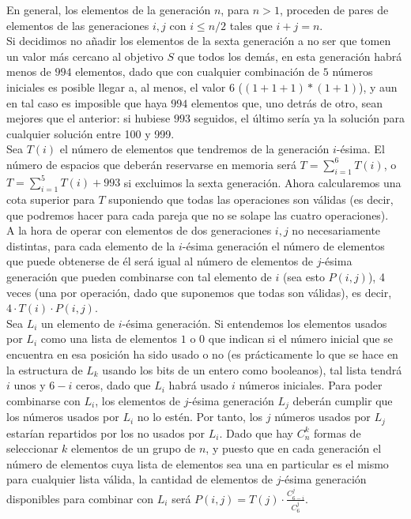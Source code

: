 En general, los elementos de la generación $n$, para $n>1$, proceden de pares de elementos de las generaciones $i,j$ con $i \le n/2$ tales que $i+j=n$.\\

Si decidimos no añadir los elementos de la sexta generación a no ser que tomen un valor más cercano al objetivo $S$ que todos los demás, en esta generación habrá menos de $994$ elementos, dado que con cualquier combinación de $5$ números iniciales es posible llegar a, al menos, el valor $6$ ($(1+1+1)*(1+1)$), y aun en tal caso es imposible que haya $994$ elementos que, uno detrás de otro, sean mejores que el anterior: si hubiese $993$ seguidos, el último sería ya la solución para cualquier solución entre 100 y 999.\\

Sea $T(i)$ el número de elementos que tendremos de la generación $i$-ésima. El número de espacios que deberán reservarse en memoria será $T = \displaystyle \sum_{i=1}^6 T(i)$, o $T = \displaystyle \sum_{i=1}^5 T(i) + 993$ si excluimos la sexta generación. Ahora calcularemos una cota superior para $T$ suponiendo que todas las operaciones son válidas (es decir, que podremos hacer para cada pareja que no se solape las cuatro operaciones).\\

A la hora de operar con elementos de dos generaciones $i,j$ no necesariamente distintas, para cada elemento de la $i$-ésima generación el número de elementos que puede obtenerse de él será igual al número de elementos de $j$-ésima generación que pueden combinarse con tal elemento de $i$ (sea esto $P(i,j)$), 4 veces (una por operación, dado que suponemos que todas son válidas), es decir, $4 \cdot T(i) \cdot P(i,j)$.\\

Sea $L_i$ un elemento de $i$-ésima generación. Si entendemos los elementos usados por $L_i$ como una lista de elementos $1$ o $0$ que indican si el número inicial que se encuentra en esa posición ha sido usado o no (es prácticamente lo que se hace en la estructura de $L_k$ usando los bits de un entero como booleanos), tal lista tendrá $i$ unos y $6-i$ ceros, dado que $L_i$ habrá usado $i$ números iniciales. Para poder combinarse con $L_i$, los elementos de $j$-ésima generación $L_j$ deberán cumplir que los números usados por $L_i$ no lo estén. Por tanto, los $j$ números usados por $L_j$ estarían repartidos por los no usados por $L_i$. Dado que hay $C_{n}^k$ formas de seleccionar $k$ elementos de un grupo de $n$, y puesto que en cada generación el número de elementos cuya lista de elementos sea una en particular es el mismo para cualquier lista válida, la cantidad de elementos de $j$-ésima generación disponibles para combinar con $L_i$ será $\displaystyle P(i,j) = T(j) \cdot \frac {C_{6-i}^j} {C_6^j}$.\\

